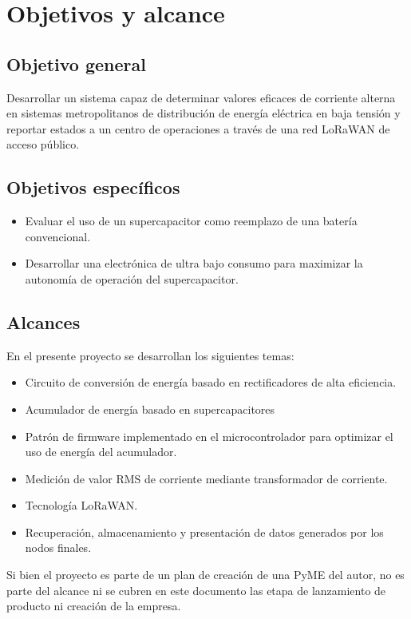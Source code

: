 
\section{Objetivos y alcance}
\subsection{Objetivo general}
Desarrollar un sistema capaz de determinar valores eficaces de corriente alterna en sistemas metropolitanos de distribución de energía eléctrica en baja tensión y reportar estados a un centro de operaciones a través de una red LoRaWAN de acceso público.\\
\subsection{Objetivos específicos}
\begin{itemize}
	\item Evaluar el uso de un supercapacitor como reemplazo de una batería convencional.\\
	\item Desarrollar una electrónica de ultra bajo consumo para maximizar la autonomía de operación del supercapacitor.
\end{itemize}
\subsection{Alcances}
En el presente proyecto se desarrollan los siguientes temas:
\begin{itemize}
	\item Circuito de conversión de energía  basado en rectificadores de alta eficiencia.
	\item Acumulador de energía basado en supercapacitores
	\item Patrón de firmware implementado en el microcontrolador para optimizar el uso de energía del acumulador.
	\item Medición de valor RMS de corriente mediante transformador de corriente.
	\item Tecnología LoRaWAN.
	\item Recuperación, almacenamiento y presentación de datos generados por los nodos finales.
\end{itemize}
Si bien el proyecto es parte de un plan de creación de una PyME del autor, no es parte del alcance ni se cubren en este documento las etapa de lanzamiento de producto ni creación de la empresa.

